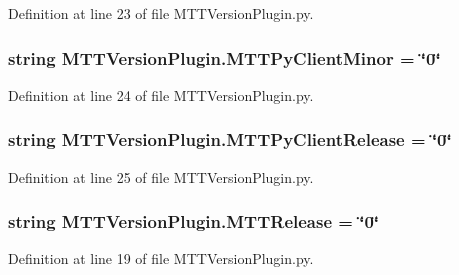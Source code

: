 Definition at line 23 of file M\-T\-T\-Version\-Plugin.\-py.

\hypertarget{namespaceMTTVersionPlugin_aa431ead037b1e7329d119bc1e4017ced}{
\subsubsection[{M\-T\-T\-Py\-Client\-Minor}]{\setlength{\rightskip}{0pt plus 5cm}string M\-T\-T\-Version\-Plugin.\-M\-T\-T\-Py\-Client\-Minor = \char`\"{}0\char`\"{}}}\label{namespaceMTTVersionPlugin_aa431ead037b1e7329d119bc1e4017ced}


Definition at line 24 of file M\-T\-T\-Version\-Plugin.\-py.

\hypertarget{namespaceMTTVersionPlugin_ae6cedc84f8ae714487299ccdc4403a10}{
\subsubsection[{M\-T\-T\-Py\-Client\-Release}]{\setlength{\rightskip}{0pt plus 5cm}string M\-T\-T\-Version\-Plugin.\-M\-T\-T\-Py\-Client\-Release = \char`\"{}0\char`\"{}}}\label{namespaceMTTVersionPlugin_ae6cedc84f8ae714487299ccdc4403a10}


Definition at line 25 of file M\-T\-T\-Version\-Plugin.\-py.

\hypertarget{namespaceMTTVersionPlugin_a9d8e0707641b9a16174563aacdc82407}{
\subsubsection[{M\-T\-T\-Release}]{\setlength{\rightskip}{0pt plus 5cm}string M\-T\-T\-Version\-Plugin.\-M\-T\-T\-Release = \char`\"{}0\char`\"{}}}\label{namespaceMTTVersionPlugin_a9d8e0707641b9a16174563aacdc82407}


Definition at line 19 of file M\-T\-T\-Version\-Plugin.\-py.

